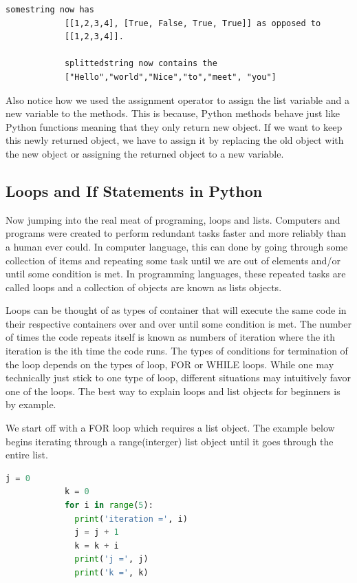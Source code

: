\documentclass[11pt,a4paper]{book}
\begin{document}
			\begin{lstlisting}[caption = Transformation of the new lists]
			somestring now has 
			[[1,2,3,4], [True, False, True, True]] as opposed to 
			[[1,2,3,4]].
			
			splittedstring now contains the  
			["Hello","world","Nice","to","meet", "you"]
			\end{lstlisting}
			
			Also notice how we used the assignment operator to assign the list variable and a new variable to the methods. This is because, Python methods behave just like Python functions meaning that they only return new object. If we want to keep this newly returned object, we have to assign it by replacing the old object with the new object or assigning the returned object to a new variable. 
		\subsection{Loops and If Statements in Python}
			\label{subsec:Loops and If Statements in Python}
			Now jumping into the real meat of programing, loops and lists. Computers and programs were created to perform redundant tasks faster and more reliably than a human ever could. In computer language, this can done by going through some collection of items and repeating some task until we are out of elements and/or until some condition is met. In programming languages, these repeated tasks are called loops and a collection of objects are known as lists objects.
			
			Loops can be thought of as types of container that will execute the same code in their respective containers over and over until some condition is met. The number of times the code repeats itself is known as numbers of iteration where the ith iteration is the ith time the code runs. The types of conditions for termination of the loop depends on the types of loop, FOR or WHILE loops. While one may technically just stick to one type of loop, different situations may intuitively favor one of the loops. The best way to explain loops and list objects for  beginners is by example. 
			
			We start off with a FOR loop which requires a list object. The example below begins iterating through a range(interger) list object until it goes through the entire list.
			
			\begin{lstlisting}[language=Python, caption=For loop example]
			j = 0
			k = 0
			for i in range(5):
			  print('iteration =', i)
			  j = j + 1
			  k = k + i
			  print('j =', j)
			  print('k =', k)
			\end{lstlisting}
			
\end{document}
